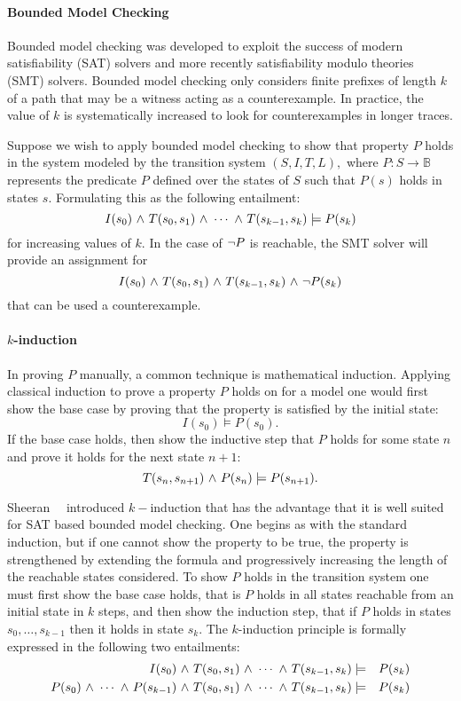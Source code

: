 \paragraph{Bounded Model Checking} Bounded model checking was developed to exploit the success of modern
satisfiability (SAT) solvers and more recently satisfiability modulo
theories (SMT) solvers. Bounded model checking only considers finite
prefixes of length $k$  of a path that may be a witness acting as a
counterexample. In practice, the value of $k$ is systematically
increased to look for counterexamples in longer traces.  

  
Suppose we wish to apply bounded model checking to show that property
$P$ holds in  the system modeled by the transition
system $(S,I,T,L),$ where $P: S \rightarrow \mathbb{B}$ represents
the predicate $P$ defined over the states of $S$ such that $P(s)$
holds in states $s.$
Formulating this as the following entailment:
$$ I(s_0) {\ \wedge \ } T(s_0,s_1) {\ \wedge \ } \cdots {\ \wedge \ } T(s_{k-1},s_k)
\models P(s_k)$$
for increasing values of $k.$ In the case of ${\neg} P$ is reachable,
the SMT solver will provide an assignment for 
$$I(s_0) {\ \wedge \ } T(s_0,s_1) {\ \wedge \ } T(s_{k-1},s_k) {\ \wedge \ } {\neg}
P(s_k)$$
that can be used a counterexample. 

\paragraph{$k$-induction}  In proving $P$ manually, a common technique
is mathematical induction.  Applying classical induction to prove a
property $P$ holds on  for a model one would first show the base case
by proving that the property is satisfied by the initial state:
$$I(s_0) \models P(s_0).$$
If the base case holds, then show the inductive step that $P$ holds
for some state $n$ and prove it holds for the next state $n+1:$
$$ T(s_{n},s_{n+1}) {\ \wedge \ } P(s_n) \models P(s_{n+1}).$$

Sheeran~\etal~\cite{Sheeran00, EenS03} introduced
$k-$induction that has the advantage that it is well suited for SAT
based bounded model checking.  One begins as with the standard
induction, but if one cannot show the property to be true, the
property is strengthened by extending the formula and
progressively increasing the length of the reachable states
considered.  To show $P$ holds in the transition system one must first
show the base case holds, that is $P$ holds in all states reachable
from an initial state in $k$ steps, and then show the induction step,
that if $P$ holds in states $s_0,\ldots,s_{k-1}$ then it holds in
state $s_k.$ The $k$-induction principle is formally expressed in the
following two entailments:
\begin{eqnarray*}
I(s_0) {\ \wedge \ } T(s_0,s_1) {\ \wedge \ } \cdots {\ \wedge \ } T(s_{k-1},s_k) &\models&
P(s_k) \\
P(s_0) {\ \wedge \ } \cdots {\ \wedge \ } P(s_{k-1}) {\ \wedge \ } T(s_0,s_1) {\ \wedge \ } \cdots {\ \wedge \ } T(s_{k-1},s_k) &\models&
P(s_k) 
\end{eqnarray*} 

